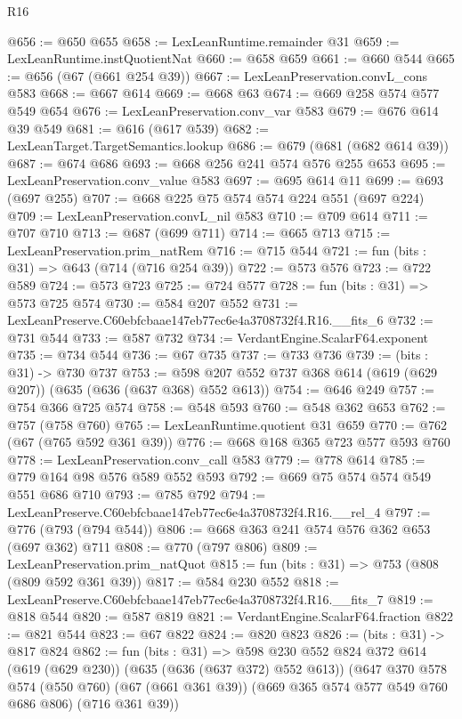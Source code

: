 \begin{lexlean}{R16}
\begin{coremodule}
@656 := @650 @655
@658 := LexLeanRuntime.remainder @31
@659 := LexLeanRuntime.instQuotientNat
@660 := @658 @659
@661 := @660 @544
@665 := @656 (@67 (@661 @254 @39))
@667 := LexLeanPreservation.convL_cons @583
@668 := @667 @614
@669 := @668 @63
@674 := @669 @258 @574 @577 @549 @654
@676 := LexLeanPreservation.conv_var @583
@679 := @676 @614 @39 @549
@681 := @616 (@617 @539)
@682 := LexLeanTarget.TargetSemantics.lookup
@686 := @679 (@681 (@682 @614 @39))
@687 := @674 @686
@693 := @668 @256 @241 @574 @576 @255 @653
@695 := LexLeanPreservation.conv_value @583
@697 := @695 @614 @11
@699 := @693 (@697 @255)
@707 := @668 @225 @75 @574 @574 @224 @551 (@697 @224)
@709 := LexLeanPreservation.convL_nil @583
@710 := @709 @614
@711 := @707 @710
@713 := @687 (@699 @711)
@714 := @665 @713
@715 := LexLeanPreservation.prim_natRem
@716 := @715 @544
@721 := fun (bits : @31) => @643 (@714 (@716 @254 @39))
@722 := @573 @576
@723 := @722 @589
@724 := @573 @723
@725 := @724 @577
@728 := fun (bits : @31) => @573 @725 @574
@730 := @584 @207 @552
@731 := LexLeanPreserve.C60ebfcbaae147eb77ec6e4a3708732f4.R16.__fits_6
@732 := @731 @544
@733 := @587 @732
@734 := VerdantEngine.ScalarF64.exponent
@735 := @734 @544
@736 := @67 @735
@737 := @733 @736
@739 := (bits : @31) -> @730 @737
@753 := @598 @207 @552 @737 @368 @614 (@619 (@629 @207)) (@635 (@636 (@637 @368) @552 @613))
@754 := @646 @249
@757 := @754 @366 @725 @574
@758 := @548 @593
@760 := @548 @362 @653
@762 := @757 (@758 @760)
@765 := LexLeanRuntime.quotient @31 @659
@770 := @762 (@67 (@765 @592 @361 @39))
@776 := @668 @168 @365 @723 @577 @593 @760
@778 := LexLeanPreservation.conv_call @583
@779 := @778 @614
@785 := @779 @164 @98 @576 @589 @552 @593
@792 := @669 @75 @574 @574 @549 @551 @686 @710
@793 := @785 @792
@794 := LexLeanPreserve.C60ebfcbaae147eb77ec6e4a3708732f4.R16.__rel_4
@797 := @776 (@793 (@794 @544))
@806 := @668 @363 @241 @574 @576 @362 @653 (@697 @362) @711
@808 := @770 (@797 @806)
@809 := LexLeanPreservation.prim_natQuot
@815 := fun (bits : @31) => @753 (@808 (@809 @592 @361 @39))
@817 := @584 @230 @552
@818 := LexLeanPreserve.C60ebfcbaae147eb77ec6e4a3708732f4.R16.__fits_7
@819 := @818 @544
@820 := @587 @819
@821 := VerdantEngine.ScalarF64.fraction
@822 := @821 @544
@823 := @67 @822
@824 := @820 @823
@826 := (bits : @31) -> @817 @824
@862 := fun (bits : @31) =>
  @598
    @230
    @552
    @824
    @372
    @614
    (@619 (@629 @230))
    (@635 (@636 (@637 @372) @552 @613))
    (@647
      @370
      @578
      @574
      (@550 @760)
      (@67 (@661 @361 @39))
      (@669 @365 @574 @577 @549 @760 @686 @806)
      (@716 @361 @39))

\end{coremodule}
\end{lexlean}

